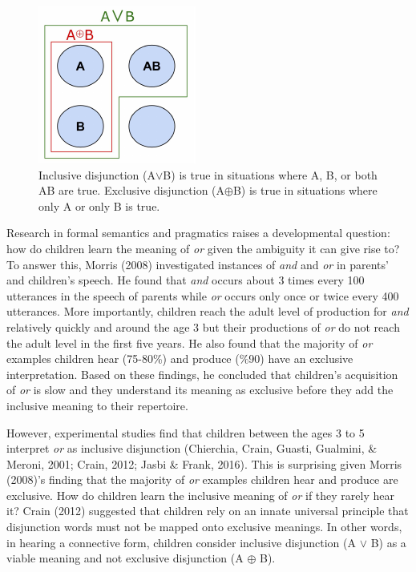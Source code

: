 \documentclass[10pt, letterpaper]{article}
\newenvironment{CodeChunk}{}{}
\begin{document}
\begin{CodeChunk}
\begin{figure}[b]

{\centering \includegraphics{figs/aorb-1} 

}

\caption[Inclusive disjunction (A$\vee$B) is true in situations where A, B, or both AB are true]{Inclusive disjunction (A$\vee$B) is true in situations where A, B, or both AB are true. Exclusive disjunction (A$\oplus$B) is true in situations where only A or only B is true.}\label{fig:aorb}
\end{figure}
\end{CodeChunk}

Research in formal semantics and pragmatics raises a developmental
question: how do children learn the meaning of \emph{or} given the
ambiguity it can give rise to? To answer this, Morris (2008)
investigated instances of \emph{and} and \emph{or} in parents' and
children's speech. He found that \emph{and} occurs about 3 times every
100 utterances in the speech of parents while \emph{or} occurs only once
or twice every 400 utterances. More importantly, children reach the
adult level of production for \emph{and} relatively quickly and around
the age 3 but their productions of \emph{or} do not reach the adult
level in the first five years. He also found that the majority of
\emph{or} examples children hear (75-80\%) and produce (\%90) have an
exclusive interpretation. Based on these findings, he concluded that
children's acquisition of \emph{or} is slow and they understand its
meaning as exclusive before they add the inclusive meaning to their
repertoire.

However, experimental studies find that children between the ages 3 to 5
interpret \emph{or} as inclusive disjunction (Chierchia, Crain, Guasti,
Gualmini, \& Meroni, 2001; Crain, 2012; Jasbi \& Frank, 2016). This is
surprising given Morris (2008)'s finding that the majority of \emph{or}
examples children hear and produce are exclusive. How do children learn
the inclusive meaning of \emph{or} if they rarely hear it? Crain (2012)
suggested that children rely on an innate universal principle that
disjunction words must not be mapped onto exclusive meanings. In other
words, in hearing a connective form, children consider inclusive
disjunction (A \(\vee\) B) as a viable meaning and not exclusive
disjunction (A \(\oplus\) B).
\end{document}
